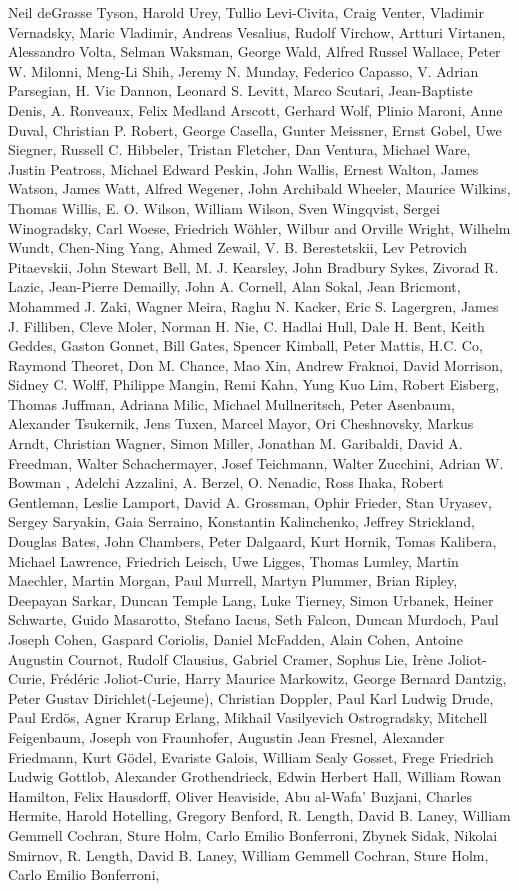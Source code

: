 \begin{spacing}{0.5}
\begin{tiny}
Neil deGrasse Tyson, Harold Urey, Tullio Levi-Civita, Craig Venter, Vladimir Vernadsky, Maric Vladimir, Andreas Vesalius, Rudolf Virchow, Artturi Virtanen, Alessandro Volta, Selman Waksman, George Wald, Alfred Russel Wallace, Peter W. Milonni, Meng-Li Shih, Jeremy N. Munday, Federico Capasso, V. Adrian Parsegian, H. Vic Dannon, Leonard S. Levitt, Marco Scutari, Jean-Baptiste Denis, A. Ronveaux, Felix Medland Arscott, Gerhard Wolf, Plinio Maroni, Anne Duval, Christian P. Robert, George Casella, Gunter Meissner, Ernst Gobel, Uwe Siegner, Russell C. Hibbeler, Tristan Fletcher, Dan Ventura, Michael Ware, Justin Peatross, Michael Edward Peskin, John Wallis, Ernest Walton, James Watson, James Watt, Alfred Wegener, John Archibald Wheeler, Maurice Wilkins, Thomas Willis, E. O. Wilson, William Wilson, Sven Wingqvist, Sergei Winogradsky, Carl Woese, Friedrich Wöhler, Wilbur and Orville Wright, Wilhelm Wundt, Chen-Ning Yang, Ahmed Zewail, V. B. Berestetskii, Lev Petrovich Pitaevskii, John Stewart Bell, M. J. Kearsley, John Bradbury Sykes, Zivorad R. Lazic, Jean-Pierre Demailly, John A. Cornell, Alan Sokal, Jean Bricmont, Mohammed J. Zaki, Wagner Meira, Raghu N. Kacker, Eric S. Lagergren, James J. Filliben, Cleve Moler, Norman H. Nie, C. Hadlai Hull, Dale H. Bent, Keith Geddes, Gaston Gonnet, Bill Gates, Spencer Kimball, Peter Mattis, H.C. Co, Raymond Theoret, Don M. Chance, Mao Xin, Andrew Fraknoi, David Morrison, Sidney C. Wolff, Philippe Mangin, Remi Kahn, Yung Kuo Lim, Robert Eisberg, Thomas Juffman, Adriana Milic, Michael Mullneritsch, Peter Asenbaum, Alexander Tsukernik, Jens Tuxen, Marcel Mayor, Ori Cheshnovsky, Markus Arndt, Christian Wagner, Simon Miller, Jonathan M. Garibaldi, David A. Freedman, Walter Schachermayer, Josef Teichmann, Walter Zucchini, Adrian W. Bowman , Adelchi Azzalini, A. Berzel, O. Nenadic, Ross Ihaka, Robert Gentleman, Leslie Lamport, David A. Grossman, Ophir Frieder, Stan Uryasev, Sergey Saryakin, Gaia Serraino, Konstantin Kalinchenko, Jeffrey Strickland, Douglas Bates, John Chambers, Peter Dalgaard, Kurt Hornik, Tomas Kalibera, Michael Lawrence, Friedrich Leisch, Uwe Ligges, Thomas Lumley, Martin Maechler, Martin Morgan, Paul Murrell, Martyn Plummer, Brian Ripley, Deepayan Sarkar, Duncan Temple Lang, Luke Tierney, Simon Urbanek, Heiner Schwarte, Guido Masarotto, Stefano Iacus, Seth Falcon, Duncan Murdoch, Paul Joseph Cohen, Gaspard Coriolis, Daniel McFadden, Alain Cohen, Antoine Augustin Cournot, Rudolf Clausius, Gabriel Cramer, Sophus Lie, Irène Joliot-Curie, Frédéric Joliot-Curie, Harry Maurice Markowitz, George Bernard Dantzig, Peter Gustav Dirichlet(-Lejeune), Christian Doppler, Paul Karl Ludwig Drude, Paul Erdös, Agner Krarup Erlang, Mikhail Vasilyevich Ostrogradsky, Mitchell Feigenbaum, Joseph von Fraunhofer, Augustin Jean Fresnel, Alexander Friedmann, Kurt Gödel, Evariste Galois, William Sealy Gosset, Frege Friedrich Ludwig Gottlob, Alexander Grothendrieck, Edwin Herbert Hall, William Rowan Hamilton, Felix Hausdorff, Oliver Heaviside, Abu al-Wafa' Buzjani, Charles Hermite, Harold Hotelling, Gregory Benford, R. Length, David B. Laney, William Gemmell Cochran, Sture Holm, Carlo Emilio Bonferroni, Zbynek Sidak, Nikolai Smirnov, R. Length, David B. Laney, William Gemmell Cochran, Sture Holm, Carlo Emilio Bonferroni, 
\end{tiny}
\end{spacing}
